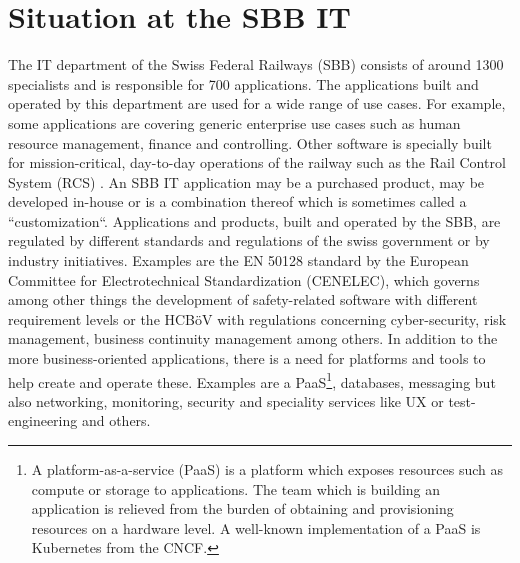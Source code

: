 \documentclass[a4paper,12pt]{article}
\begin{document}
    \section{Situation at the SBB IT}
    \label{sec:sbbit}
    The IT department of the Swiss Federal Railways (SBB) consists of around 1300 specialists and is responsible for
    700 applications\parencite{sbbitkennzahlen}.
    The applications built and operated by this department are used for a wide range of use cases.
    For example, some applications are covering generic enterprise use cases such as human resource management, finance
    and controlling.
    Other software is specially built for mission-critical, day-to-day operations of the railway such as the Rail Control
    System (RCS)\parencite{sbbrcs} .
    An SBB IT application may be a purchased product, may be developed in-house or is a combination thereof which is
    sometimes called a ``customization``.
    Applications and products, built and operated by the SBB, are regulated by different standards and regulations of the
    swiss government or by industry initiatives.
    Examples are the EN 50128 standard by the European Committee for Electrotechnical Standardization (CENELEC)\parencite{cenelec},
    which governs among other things the development of safety-related software with different requirement levels
    or the HCBöV\parencite{hcboev} with regulations concerning cyber-security, risk management, business continuity
    management among others.
    In addition to the more business-oriented applications, there is a need for platforms and tools to help create
    and operate these.
    Examples are a PaaS\footnote{A platform-as-a-service (PaaS) is a platform which exposes resources such as compute or
    storage to applications. The team which is building an application is relieved from the burden of obtaining and
    provisioning resources on a hardware level. A well-known implementation of a PaaS is Kubernetes from the CNCF.},
    databases, messaging but also networking, monitoring, security and
    speciality services like UX or test-engineering and others.
\end{document}
